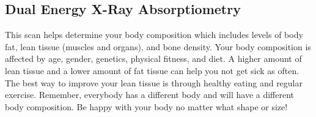 \subsection{Dual Energy X-Ray Absorptiometry}

This scan helps determine your body composition which includes levels of body fat, lean tissue (muscles and organs), and bone density. Your body composition is affected by age, gender, genetics, physical fitness, and diet. A higher amount of lean tissue and a lower amount of fat tissue can help you not get sick as often. The best way to improve your lean tissue is through healthy eating and regular exercise. 
Remember, everybody has a different body and will have a different body composition. Be happy with your body no matter what shape or size!
